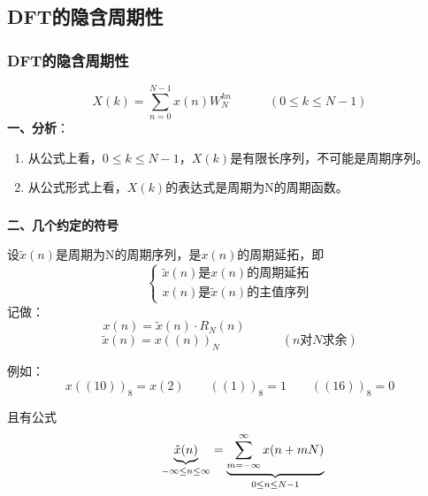 \documentclass[notheorems,compress,mathserif,table]{beamer}
\begin{document}





\subsection{DFT的隐含周期性}

\begin{frame}[shrink]\frametitle{DFT的隐含周期性}%
$$X(k) = \sum_{n=0}^{N-1}x(n) W_N^{kn} \quad\quad\quad (0 \leq k \leq N-1) $$
\textbf{一、分析}：
\begin{enumerate}
  \item 从公式上看，$0 \leq k \leq N-1$，$X(k)$是有限长序列，不可能是周期序列。
  \item 从公式形式上看，$X(k)$的表达式是周期为N的周期函数。
\end{enumerate}

%
\end{frame}
%



\begin{frame}[shrink]\frametitle{}%
\textbf{二、几个约定的符号}

设$\tilde{x}(n)$是周期为N的周期序列，是$x(n)$的周期延拓，即
\begin{equation*}
    \left\{ \begin{aligned}
    \tilde{x}(n)\mbox{是$x(n)$的周期延拓} \\
    x(n)\mbox{是$\tilde{x}(n)$的主值序列}
    \end{aligned} \right.
\end{equation*}
记做：
$$  x(n) = \tilde{x}(n)\cdot R_N(n) \quad\quad\quad\quad\quad\quad\quad\quad\quad$$
$$  \tilde{x}(n)   = x((n))_N  \quad\quad\quad\quad\quad (\mbox{$n$对$N$求余})$$

例如： $$x((10))_8 = x(2) \quad\quad ((1))_8 = 1  \quad\quad ((16))_8 =0 $$

且有公式
$$\mbox{\quad\quad }   \underbrace{\tilde{x}(n)}_{-\infty\leq n\leq \infty} =
 \underbrace{\sum_{m=-\infty}^{\infty}x(n+mN)}_{0 \leq n\leq N-1}$$
\end{frame}
\end{document}
